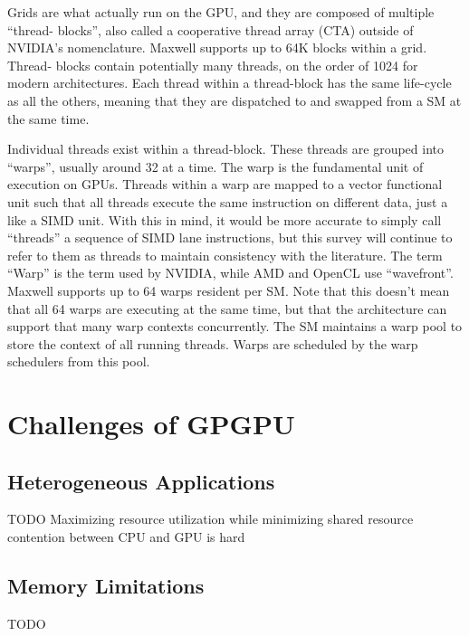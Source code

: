 \documentclass[prodmode,acmtecs]{acmsmall} %
\begin{document}
Grids are what actually run on the GPU, and they are composed of multiple
``thread- blocks'', also called a cooperative thread array (CTA) outside of
NVIDIA's nomenclature. Maxwell supports up to 64K blocks within a grid. Thread-
blocks contain potentially many threads, on the order of 1024 for modern
architectures. Each thread within a thread-block has the same life-cycle as all
the others, meaning that they are dispatched to and swapped from a SM at the
same time.

Individual threads exist within a thread-block. These threads are grouped into
``warps'', usually around 32 at a time. The warp is the fundamental unit of
execution on GPUs. Threads within a warp are mapped to a vector functional unit
such that all threads execute the same instruction on different data, just a
like a SIMD unit. With this in mind, it would be more accurate to simply call
``threads'' a sequence of SIMD lane instructions, but this survey will continue
to refer to them as threads to maintain consistency with the literature. The
term ``Warp'' is the term used by NVIDIA, while AMD and OpenCL use
``wavefront''. Maxwell supports up to 64 warps resident per SM. Note that this
doesn't mean that all 64 warps are executing at the same time, but that the
architecture can support that many warp contexts concurrently. The SM maintains
a warp pool to store the context of all running threads. Warps are scheduled by
the warp schedulers from this pool.

\section{Challenges of GPGPU} \label{sec:challenges}
\subsection{Heterogeneous Applications}
TODO Maximizing resource utilization while minimizing shared resource contention
between CPU and GPU is hard
\subsection{Memory Limitations}
TODO
\end{document}
